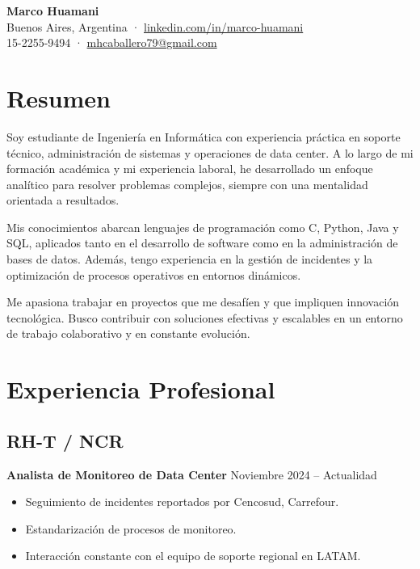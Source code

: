 \documentclass[a4paper,10pt]{article}
\begin{document}
\begin{center}
    \textbf{\Huge Marco Huamani} \\
    \vspace{0.2cm}
    Buenos Aires, Argentina · \href{https://www.linkedin.com/in/marco-huamani}{linkedin.com/in/marco-huamani} \\
    15-2255-9494 · \href{mailto:mhcaballero79@gmail.com}{mhcaballero79@gmail.com}
\end{center}

\vspace{0.5cm}

\section*{Resumen}
Soy estudiante de Ingeniería en Informática con experiencia práctica en soporte técnico, administración de sistemas y operaciones de data center. A lo largo de mi formación académica y mi experiencia laboral, he desarrollado un enfoque analítico para resolver problemas complejos, siempre con una mentalidad orientada a resultados. 

Mis conocimientos abarcan lenguajes de programación como C, Python, Java y SQL, aplicados tanto en el desarrollo de software como en la administración de bases de datos. Además, tengo experiencia en la gestión de incidentes y la optimización de procesos operativos en entornos dinámicos. 

Me apasiona trabajar en proyectos que me desafíen y que impliquen innovación tecnológica. Busco contribuir con soluciones efectivas y escalables en un entorno de trabajo colaborativo y en constante evolución.

\vspace{0.5cm}

\section*{Experiencia Profesional}

\subsection*{\Large\textbf{RH-T / NCR}}
\textbf{\normalsize Analista de Monitoreo de Data Center} \hfill Noviembre 2024 – Actualidad
\begin{itemize}
    \item Seguimiento de incidentes reportados por Cencosud, Carrefour.
    \item Estandarización de procesos de monitoreo.
    \item Interacción constante con el equipo de soporte regional en LATAM.
\end{itemize}
\end{document}
